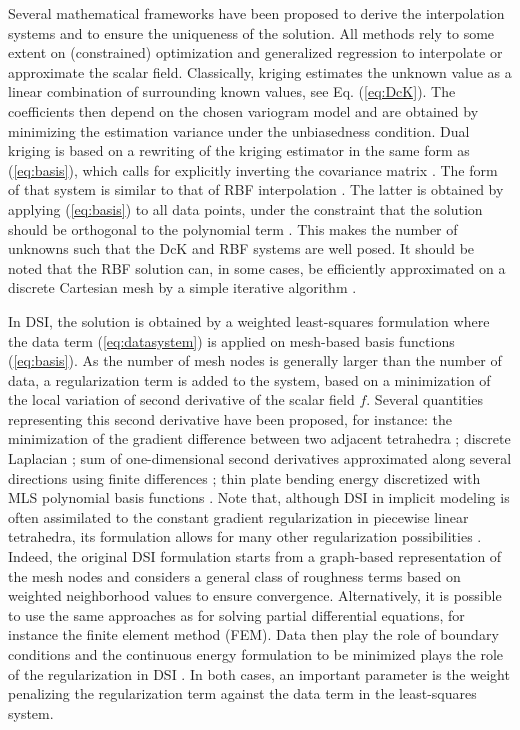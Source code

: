 \documentclass[preprint]{ring20}
\begin{document}
Several mathematical frameworks have been proposed to derive the interpolation systems and to ensure the uniqueness of the solution. 
All methods rely to some extent on (constrained) optimization and generalized regression to interpolate or approximate the scalar field. Classically, kriging estimates the unknown value as a linear combination of surrounding known values, see Eq. (\ref{eq:DcK}). The coefficients then depend on the chosen variogram model and are obtained by minimizing the estimation variance under the unbiasedness condition. Dual kriging is based on a rewriting of the kriging estimator in the same form as (\ref{eq:basis}), which calls for explicitly inverting the covariance matrix \citep{Lajaunie1997MG,Chiles04OMSMP}. The form of that system is similar to that of RBF interpolation \citep{Dubrule1984CG,Hillier2014MG}. The latter is obtained by applying (\ref{eq:basis}) to all data points, under the constraint that the solution should be orthogonal to the polynomial term \citep{Carr2001,Hillier2014MG}. This makes the number of unknowns such that the DcK and RBF systems are well posed. It should be noted that the RBF solution can, in some cases, be efficiently approximated on a discrete Cartesian mesh by a simple iterative algorithm \citep{Park2006ITVCG}. 

In DSI, the solution is obtained by a weighted least-squares formulation where the data term (\ref{eq:datasystem}) is applied on mesh-based basis functions (\ref{eq:basis}). As the number of mesh nodes is generally larger than the number of data, a regularization term is added to the system, based on a minimization of the local variation of second derivative of the scalar field $f$. Several quantities representing this second derivative have been proposed, for instance: the minimization of the gradient difference between two adjacent tetrahedra \citep{Frank2007CG}; discrete Laplacian \citep{Irakarama2021MG,Irakarama2022CD}; sum of one-dimensional second derivatives approximated along several directions using finite differences \citep{Irakarama2021MG}; thin plate bending energy discretized with MLS polynomial basis functions \citep{Renaudeau2019MG}. Note that, although DSI in implicit modeling is often assimilated to the constant gradient regularization in piecewise linear tetrahedra, its formulation allows for many other regularization possibilities \citep{Mallet1992CD}. Indeed, the original DSI formulation starts from a graph-based representation of the mesh nodes and considers a general class of roughness terms based on weighted neighborhood values to ensure convergence. Alternatively, it is possible to use the same approaches as for solving partial differential equations, for instance the finite element method (FEM). Data then play the role of boundary conditions and the continuous energy formulation to be minimized plays the role of the regularization in DSI \citep{Renaudeau2019MG}. In both cases, an important parameter is the weight penalizing the regularization term against the data term in the least-squares system. 
\end{document}
